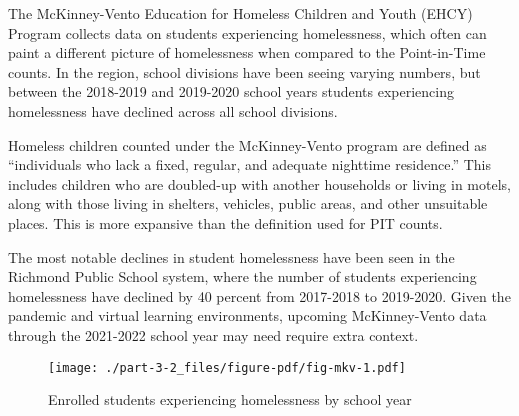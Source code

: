\documentclass[
  letterpaper,
  DIV=11,
  numbers=noendperiod]{scrreprt}
\begin{document}
The McKinney-Vento Education for Homeless Children and Youth (EHCY)
Program collects data on students experiencing homelessness, which often
can paint a different picture of homelessness when compared to the
Point-in-Time counts. In the region, school divisions have been seeing
varying numbers, but between the 2018-2019 and 2019-2020 school years
students experiencing homelessness have declined across all school
divisions.

\begin{tcolorbox}[enhanced jigsaw, colback=white, colbacktitle=quarto-callout-tip-color!10!white, bottomrule=.15mm, opacitybacktitle=0.6, colframe=quarto-callout-tip-color-frame, breakable, opacityback=0, bottomtitle=1mm, titlerule=0mm, coltitle=black, leftrule=.75mm, left=2mm, title=\textcolor{quarto-callout-tip-color}{\faLightbulb}\hspace{0.5em}{Tip}, toptitle=1mm, arc=.35mm, rightrule=.15mm, toprule=.15mm]
Homeless children counted under the McKinney-Vento program are defined
as ``individuals who lack a fixed, regular, and adequate nighttime
residence.'' This includes children who are doubled-up with another
households or living in motels, along with those living in shelters,
vehicles, public areas, and other unsuitable places. This is more
expansive than the definition used for PIT counts.
\end{tcolorbox}

The most notable declines in student homelessness have been seen in the
Richmond Public School system, where the number of students experiencing
homelessness have declined by 40 percent from 2017-2018 to 2019-2020.
Given the pandemic and virtual learning environments, upcoming
McKinney-Vento data through the 2021-2022 school year may need require
extra context.

\begin{figure}

{\centering \texttt{[image: ./part-3-2\_files/figure-pdf/fig-mkv-1.pdf]}

}

\caption{\label{fig-mkv}Enrolled students experiencing homelessness by
school year}

\end{figure}
\end{document}
